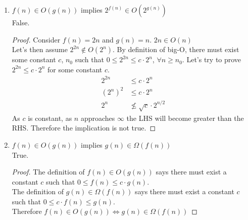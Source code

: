 \documentclass{article}
\begin{document}
\begin{enumerate}
\begin{enumerate}
                    \item $f(n)\in O(g(n))$ implies $2^{f(n)}\in O(2^{g(n)})$\\
                        False.
                        \begin{proof}
                            Consider $f(n) = 2n$ and $g(n) = n$.
                            $2n \in O(n)$\\
                            Let's then assume $2^{2n}\not\in O(2^{n})$. By definition of big-O, there must exist some constant $c$, $n_0$
                             such that $0\leq 2^{2n}\leq c\cdot 2^n$, $\forall n\geq n_0$. Let's try to prove $2^{2n}\leq c\cdot 2^n$ for some constant $c$.
                            \begin{align*}
                                2^{2n}&\leq c\cdot 2^n\\
                                (2^n)^2&\leq c\cdot 2^n\\
                                2^n&\not\leq \sqrt{c}\cdot 2^{n/2}
                            \end{align*}                      
                            As $c$ is constant, as $n$ approaches $\infty$ the LHS will become greater than the RHS. Therefore the implication is not true.
                        \end{proof}
                    \item $f(n)\in O(g(n))$ implies $g(n)\in\Omega(f(n))$\\
                        True.
                        \begin{proof}
                            The definition of $f(n)\in O(g(n))$ says there must exist a constant $c$ such that $0\leq f(n)\leq c\cdot g(n)$.\\
                            The definition of $g(n)\in\Omega(f(n))$ says there must exist a constant $c$ such that $0\leq c\cdot f(n)\leq g(n)$.\\
                            Therefore $f(n)\in O(g(n)) \Leftrightarrow g(n)\in\Omega(f(n))$


\end{proof}
\end{enumerate}
\end{enumerate}
\end{document}

